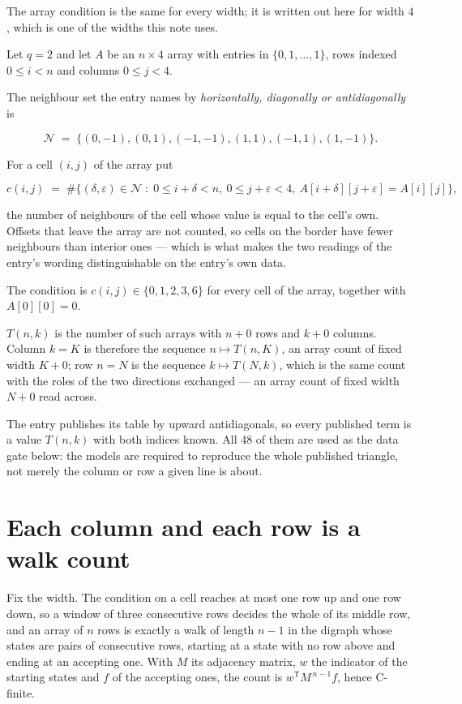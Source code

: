 \documentclass[11pt]{article}
\theoremstyle{definition}
\begin{document}
The array condition is the same for every width; it is written out here for width $4$, which is one of the widths this note uses.

Let $q = 2$ and let $A$ be an $n \times 4$ array with entries in $\{0,1,\dots,1\}$, rows indexed $0 \le i < n$ and columns $0 \le j < 4$.

The neighbour set the entry names by {\itshape horizontally, diagonally or antidiagonally} is

\[\mathcal{N} \;=\; \{(0,-1), (0,1), (-1,-1), (1,1), (-1,1), (1,-1)\}.\]

For a cell $(i,j)$ of the array put

\[c(i,j) \;=\; \#\bigl\{(\delta,\varepsilon)\in\mathcal{N} \;:\; 0\le i+\delta<n,\ 0\le j+\varepsilon<4,\ A[i+\delta][j+\varepsilon] = A[i][j]\bigr\},\]

the number of neighbours of the cell whose value is equal to the cell's own. Offsets that leave the array are not counted, so cells on the border have fewer neighbours than interior ones --- which is what makes the two readings of the entry's wording distinguishable on the entry's own data.

The condition is $c(i,j) \in \{0, 1, 2, 3, 6\}$ for every cell of the array, together with $A[0][0]=0$.

$T(n,k)$ is the number of such arrays with $n + 0$ rows and $k + 0$ columns. Column $k = K$ is therefore the sequence $n \mapsto T(n,K)$, an array count of fixed width $K + 0$; row $n = N$ is the sequence $k \mapsto T(N,k)$, which is the same count with the roles of the two directions exchanged --- an array count of fixed width $N + 0$ read across.

The entry publishes its table by upward antidiagonals, so every published term is a value $T(n,k)$ with both indices known. All 48 of them are used as the data gate below: the models are required to reproduce the whole published triangle, not merely the column or row a given line is about.

\section{Each column and each row is a walk count}

Fix the width. The condition on a cell reaches at most one row up and one row down, so a window of three consecutive rows decides the whole of its middle row, and an array of $n$ rows is exactly a walk of length $n-1$ in the digraph whose states are pairs of consecutive rows, starting at a state with no row above and ending at an accepting one. With $M$ its adjacency matrix, $w$ the indicator of the starting states and $f$ of the accepting ones, the count is $w^{\mathsf T}M^{\,n-1}f$, hence C-finite.
\end{document}
